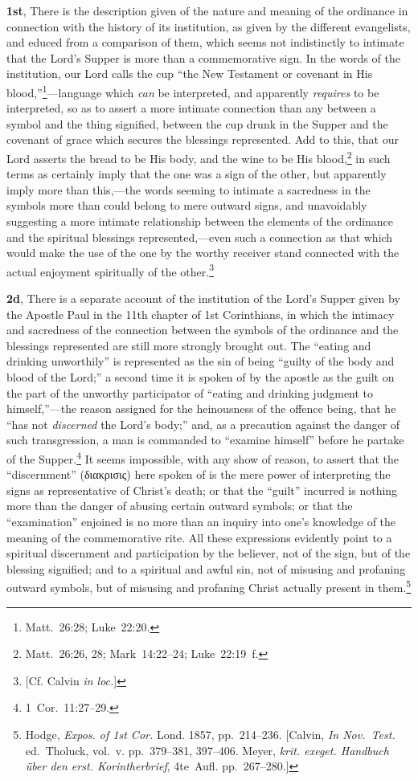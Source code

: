 \documentclass[
]{book}
\begin{document}
\textbf{1st}, There is the description given of the nature and meaning of the ordinance in connection with the history of its institution, as given by the different evangelists, and educed from a comparison of them, which seems not indistinctly to intimate that the Lord's Supper is more than a commemorative sign. In the words of the institution, our Lord calls the cup ``the New Testament or covenant in His blood,''\footnote{Matt.~26:28; Luke~22:20.}---language which \emph{can} be interpreted, and apparently \emph{requires} to be interpreted, so as to assert a more intimate connection than any between a symbol and the thing signified, between the cup drunk in the Supper and the covenant of grace which secures the blessings represented. Add to this, that our Lord asserts the bread to be His body, and the wine to be His blood,\footnote{Matt.~26:26, 28; Mark~14:22--24; Luke~22:19~f.} in such terms as certainly imply that the one was a sign of the other, but apparently imply more than this,---the words seeming to intimate a sacredness in the symbols more than could belong to mere outward signs, and unavoidably suggesting a more intimate relationship between the elements of the ordinance and the spiritual blessings represented,---even such a connection as that which would make the use of the one by the worthy receiver stand connected with the actual enjoyment spiritually of the other.\footnote{{[}Cf. Calvin \emph{in loc.}{]}}

\textbf{2d}, There is a separate account of the institution of the Lord's Supper given by the Apostle Paul in the 11th chapter of 1st Corinthians, in which the intimacy and sacredness of the connection between the symbols of the ordinance and the blessings represented are still more strongly brought out. The ``eating and drinking unworthily'' is represented as the sin of being ``guilty of the body and blood of the Lord;'' a second time it is spoken of by the apostle as the guilt on the part of the unworthy participator of ``eating and drinking judgment to himself,''---the reason assigned for the heinousness of the offence being, that he ``has not \emph{discerned} the Lord's body;'' and, as a precaution against the danger of such transgression, a man is commanded to ``examine himself'' before he partake of the Supper.\footnote{1~Cor.~11:27--29.} It seems impossible, with any show of reason, to assert that the ``discernment'' (\foreignlanguage{greek}{διακρισις}) here spoken of is the mere power of interpreting the signs as representative of Christ's death; or that the ``guilt'' incurred is nothing more than the danger of abusing certain outward symbols; or that the ``examination'' enjoined is no more than an inquiry into one's knowledge of the meaning of the commemorative rite. All these expressions evidently point to a spiritual discernment and participation by the believer, not of the sign, but of the blessing signified; and to a spiritual and awful sin, not of misusing and profaning outward symbols, but of misusing and profaning Christ actually present in them.\footnote{Hodge, \emph{Expos. of 1st Cor.} Lond. 1857, pp.~214--236. {[}Calvin, \emph{In Nov.~Test.} ed.~Tholuck, vol.~v. pp.~379--381, 397--406. Meyer, \foreignlanguage{ngerman}{\emph{krit. exeget. Handbuch über den erst. Korintherbrief}, 4te~Aufl.} pp.~267--280.{]}}
\end{document}
